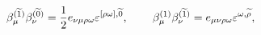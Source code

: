 \begin{equation}
\beta _\mu ^{(\widetilde{1})}\beta _\nu
^{(\widetilde{0})}=\frac{1}{2}e_{\nu\mu \rho \omega }\varepsilon
^{ [\rho\omega],\widetilde{0}} ,\hspace{0.3in}\beta _\mu
^{(1)}\beta _\nu ^{(\widetilde{1})}=e_{\mu\nu\rho \omega
}\varepsilon ^{\omega,\widetilde{\rho}} ,\label{96}
\end{equation}

